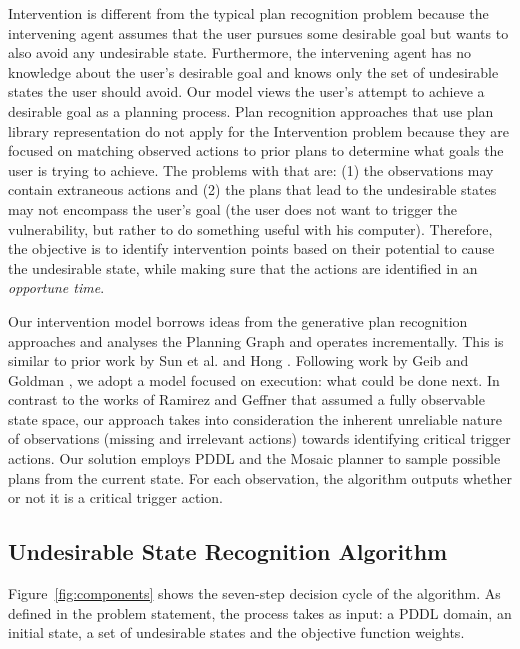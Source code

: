 Intervention is different from the typical plan recognition problem because the intervening agent assumes that the user pursues some desirable goal but wants to also avoid any undesirable state. 
Furthermore, the intervening agent has no knowledge about the user's desirable goal and knows only the set of undesirable states the user should avoid. 
Our model views the user's attempt to achieve a desirable goal as a planning process. 
Plan recognition approaches that use plan library representation do not apply for the Intervention problem because they are focused on matching observed actions to prior plans to determine what goals the user is trying to achieve.
The problems with that are: (1) the observations may contain extraneous actions and (2) the plans that lead to the undesirable states may not encompass the user's goal (the user does not want to trigger the vulnerability, but rather to do something useful with his computer).
Therefore, the objective is to identify intervention points based on their potential to cause the undesirable state, while making sure that the actions are identified in an \textit{opportune time}.

 
Our intervention model borrows ideas from the generative plan recognition approaches and analyses the Planning Graph and operates incrementally.
This is similar to prior work by Sun et al. \citeyear{sun2007recognizing} and Hong \citeyear{hong2001goal}. 
Following work by Geib and Goldman \citeyear{GeibGoldman09}, we adopt a model focused on execution: what could be done next. 
In contrast to the works of Ramirez and Geffner \citeyear{ramirez2009plan,ramirez2010probabilistic} that assumed a fully observable state space, our approach takes into consideration the inherent unreliable nature of observations (missing and irrelevant actions) towards identifying critical trigger actions. 
Our solution employs PDDL and the Mosaic planner \cite{roberts2014} to sample possible plans from the current state. 
For each observation, the algorithm outputs whether or not it is a critical trigger action. 

\subsection{Undesirable State Recognition Algorithm}
Figure~\ref{fig:components} shows the seven-step decision cycle of the algorithm. As defined in the problem statement, the process takes as input: a PDDL domain, an initial state, a set of undesirable states and the objective function weights. 

